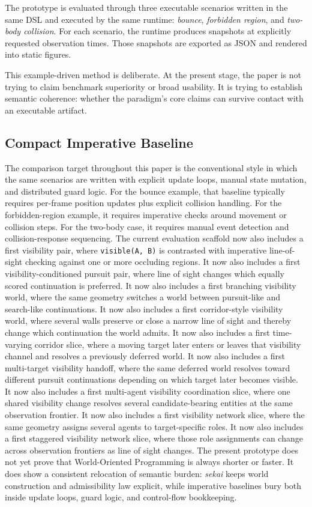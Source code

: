 \documentclass[sigplan,review,anonymous]{acmart}
\begin{document}
The prototype is evaluated through three executable scenarios written in the same DSL and executed by the same runtime:
\emph{bounce}, \emph{forbidden region}, and \emph{two-body collision}.
For each scenario, the runtime produces snapshots at explicitly requested observation times.
Those snapshots are exported as JSON and rendered into static figures.

This example-driven method is deliberate.
At the present stage, the paper is not trying to claim benchmark superiority or broad usability.
It is trying to establish semantic coherence: whether the paradigm's core claims can survive contact with an executable artifact.

\subsection{Compact Imperative Baseline}

The comparison target throughout this paper is the conventional style in which the same scenarios are written with explicit update loops, manual state mutation, and distributed guard logic.
For the bounce example, that baseline typically requires per-frame position updates plus explicit collision handling.
For the forbidden-region example, it requires imperative checks around movement or collision steps.
For the two-body case, it requires manual event detection and collision-response sequencing.
The current evaluation scaffold now also includes a first visibility pair, where \texttt{visible(A, B)} is contrasted with imperative line-of-sight checking against one or more occluding regions.
It now also includes a first visibility-conditioned pursuit pair, where line of sight changes which equally scored continuation is preferred.
It now also includes a first branching visibility world, where the same geometry switches a world between pursuit-like and search-like continuations.
It now also includes a first corridor-style visibility world, where several walls preserve or close a narrow line of sight and thereby change which continuation the world admits.
It now also includes a first time-varying corridor slice, where a moving target later enters or leaves that visibility channel and resolves a previously deferred world.
It now also includes a first multi-target visibility handoff, where the same deferred world resolves toward different pursuit continuations depending on which target later becomes visible.
It now also includes a first multi-agent visibility coordination slice, where one shared visibility change resolves several candidate-bearing entities at the same observation frontier.
It now also includes a first visibility network slice, where the same geometry assigns several agents to target-specific roles.
It now also includes a first staggered visibility network slice, where those role assignments can change across observation frontiers as line of sight changes.
The present prototype does not yet prove that World-Oriented Programming is always shorter or faster.
It does show a consistent relocation of semantic burden: \emph{sekai} keeps world construction and admissibility law explicit, while imperative baselines bury both inside update loops, guard logic, and control-flow bookkeeping.
\end{document}
